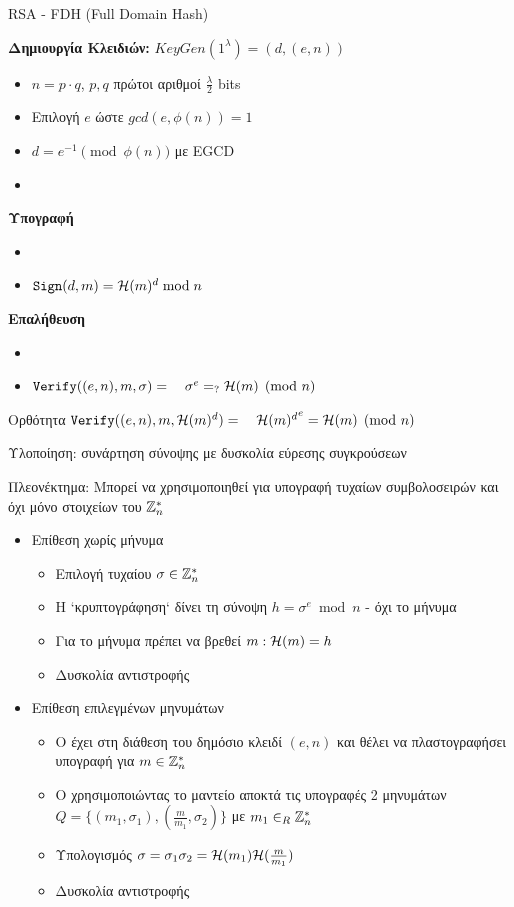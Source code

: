 \documentclass{beamer}
\begin{document}
\begin{frame}[allowframebreaks]{RSA - FDH (Full Domain Hash)}
 

\textbf{Δημιουργία Κλειδιών:}
$KeyGen(1^{\lambda}) = (d,(e,n))$
\begin{itemize}
\item $n=p \cdot q$, $p,q$ πρώτοι αριθμοί $\frac{\lambda}{2}$ bits
\item Επιλογή $e$ ώστε $gcd(e,\phi(n))=1$
\item $d = e^{-1} \pmod{\phi(n)}$ με EGCD
\item {}
\end{itemize}
  
\textbf{Υπογραφή} 
\begin{itemize}
\item {}
\item $\mathtt{Sign}(d, m) = \mathcal{H}(m)^d \bmod n$
\end{itemize}
\textbf{Επαλήθευση}
\begin{itemize}
\item {}
\item $\verify((e,n), m, \sigma) = \ \ \ \sigma^e =_? \Hash(m) \pmod{n}$
\end{itemize} 

\begin{block}{Ορθότητα}
$\mathtt{Verify}((e,n), m, \mathcal{H}(m)^d)= \ \ \  {\mathcal{H}(m)^d}^e = \mathcal{H}(m) \pmod{n}$
\end{block}
Υλοποίηση: συνάρτηση σύνοψης με δυσκολία εύρεσης συγκρούσεων
 
Πλεονέκτημα: Μπορεί να χρησιμοποιηθεί για υπογραφή τυχαίων συμβολοσειρών και όχι μόνο στοιχείων του $\mathbb{Z}^*_n$\

\framebreak

\begin{itemize}
\item Επίθεση χωρίς μήνυμα
\begin{itemize}
\item Επιλογή τυχαίου $\sigma \in \mathbb{Z}^*_n$
\item Η `κρυπτογράφηση` δίνει τη σύνοψη $h=\sigma^e \bmod{n}$ - όχι το μήνυμα
\item Για το μήνυμα πρέπει να βρεθεί $m: \mathcal{H}(m) = h$
\item Δυσκολία αντιστροφής
\end{itemize}
\framebreak

\item Επίθεση επιλεγμένων μηνυμάτων
\begin{itemize}
\item O \adv έχει στη διάθεση του δημόσιο κλειδί $(e,n)$ και θέλει να πλαστογραφήσει υπογραφή για $m \in \mathbb{Z}^*_n$
\item O \adv χρησιμοποιώντας το μαντείο αποκτά τις υπογραφές 2 μηνυμάτων $Q = \{ (m_1, \sigma_1), (\frac{m}{m_1}, \sigma_2) \}$ με $m_1 \in_R \mathbb{Z}^*_n $
\item Υπολογισμός $\sigma = \sigma_1  \sigma_2 = \mathcal{H}(m_1) \mathcal{H}(\frac{m}{m_1}) $
\item Δυσκολία αντιστροφής
\end{itemize}
\end{itemize} 



\end{frame}
\end{document}
